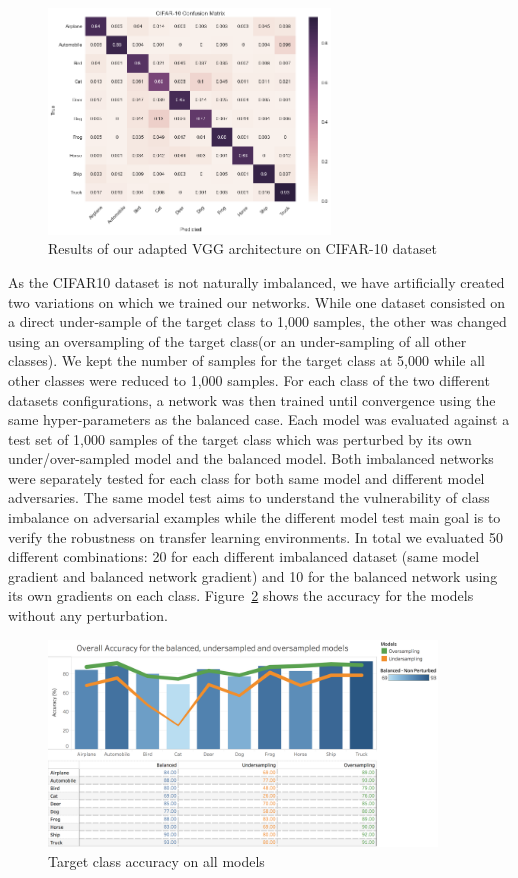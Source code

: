 \documentclass[runningheads,a4paper]{llncs}
\begin{document}
\begin{figure}
	\centering
	\includegraphics[height=6.0cm]{conf_matrix.png}
	\caption{Results of our adapted VGG architecture on CIFAR-10 dataset}
	\label{fig:conf_matrix_full}
\end{figure}

As the CIFAR10 dataset is not naturally imbalanced, we have artificially created two variations on which we trained our networks.  While one dataset consisted on a direct under-sample of the target class to 1,000 samples, the other was changed using  an oversampling of the target class(or an under-sampling of all other classes). We kept the number of samples for the target class at 5,000 while all other classes were reduced to 1,000 samples. For each class of the two different datasets configurations, a network was then trained until convergence using the same hyper-parameters as the balanced case. Each model was evaluated against a test set of 1,000 samples of the target class which was  perturbed by its own under/over-sampled model and the balanced model. Both imbalanced networks were separately tested for each class for both same model and different model adversaries. The same model test aims to understand the vulnerability of class imbalance on adversarial examples while the different model test main goal is to verify the robustness on transfer learning environments. In total we evaluated 50 different combinations: 20 for each different imbalanced dataset (same model gradient and balanced network gradient) and 10 for the balanced network using its own gradients on each class. Figure~\ref{fig:acc_graph} shows the accuracy for the models without any perturbation.
\begin{figure}
	\centering
	\includegraphics[height=5.5cm]{graph_non_pert.png}
	\caption{Target class accuracy on all models}
	\label{fig:acc_graph}
\end{figure}
\end{document}
